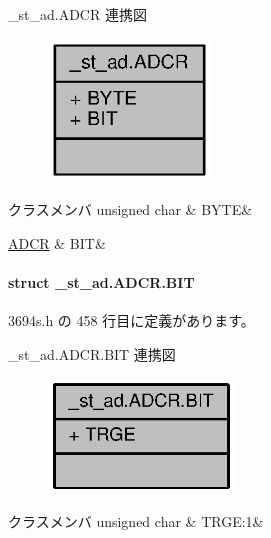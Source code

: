 \+\_\+st\+\_\+ad.\+A\+D\+C\+R 連携図
\nopagebreak
\begin{figure}[H]
\begin{center}
\leavevmode
\includegraphics[width=122pt]{d3/ded/union__st__ad_8ADCR__coll__graph}
\end{center}
\end{figure}
\begin{DoxyFields}{クラスメンバ}
unsigned char\label{3694s_8h_ae409eb2ba6eb6801f52763ae370c350e}
&
B\+Y\+T\+E&
\\
\hline

\hyperlink{3694s_8h_de/d48/struct__st__ad_8ADCR_8BIT}{A\+D\+C\+R}\label{3694s_8h_adb957fdc8000e1eef04a243f5199aa52}
&
B\+I\+T&
\\
\hline

\end{DoxyFields}
\label{struct__st__ad_8ADCR_8BIT}
\paragraph{struct \+\_\+st\+\_\+ad.\+A\+D\+C\+R.\+B\+I\+T}


 3694s.\+h の 458 行目に定義があります。



\+\_\+st\+\_\+ad.\+A\+D\+C\+R.\+B\+I\+T 連携図
\nopagebreak
\begin{figure}[H]
\begin{center}
\leavevmode
\includegraphics[width=140pt]{d7/dd9/struct__st__ad_8ADCR_8BIT__coll__graph}
\end{center}
\end{figure}
\begin{DoxyFields}{クラスメンバ}
unsigned char\label{3694s_8h_a899687deda79b404dc72076da2c1ac1f}
&
T\+R\+G\+E\+:1&
\\
\hline

\end{DoxyFields}
\label{union__st__wdt_8TCSRWD}
